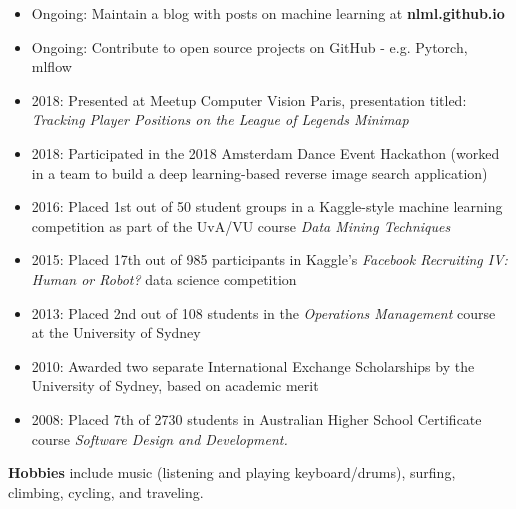 \documentclass[margin]{res}
\begin{document}
\begin{resume}
		\begin{itemize}
			\item Ongoing: Maintain a blog with posts on machine learning at \textbf{nlml.github.io}
			\item Ongoing: Contribute to open source projects on GitHub - e.g. Pytorch, mlflow
			\item 2018: Presented at Meetup Computer Vision Paris, presentation titled:\\ \emph{Tracking Player Positions on the League of Legends Minimap}
			\item 2018: Participated in the 2018 Amsterdam Dance Event Hackathon (worked in a team to build a deep learning-based reverse image search application)
			\item 2016: Placed 1st out of 50 student groups in a Kaggle-style machine learning competition as part of the UvA/VU course \textit{Data Mining Techniques}
			\item 2015: Placed 17th out of 985 participants in Kaggle's {\sl Facebook Recruiting IV: Human or Robot?} data science competition
			\item 2013: Placed 2nd out of 108 students in the \textit{Operations Management} course at the University of Sydney
			\item 2010: Awarded two separate International Exchange Scholarships by the University of Sydney, based on academic merit
			\item 2008: Placed 7th of 2730 students in Australian Higher School Certificate course {\sl Software Design and Development.}
		\end{itemize}
	\textbf{Hobbies} include music (listening and playing keyboard/drums), surfing, climbing, cycling, and traveling.
		
	\end{resume}
	
\end{document}
